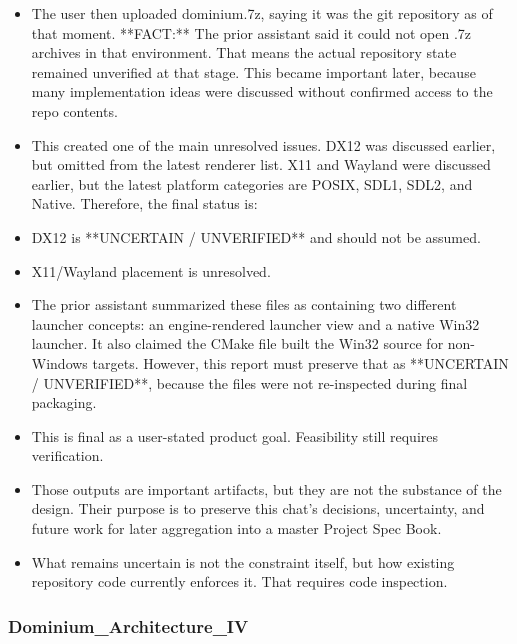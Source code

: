\documentclass[11pt,a4paper]{report}
\begin{document}
\begin{itemize}
\item The user then uploaded dominium.7z, saying it was the git repository as of that moment. **FACT:** The prior assistant said it could not open .7z archives in that environment. That means the actual repository state remained unverified at that stage. This became important later, because many implementation ideas were discussed without confirmed access to the repo contents.
\item This created one of the main unresolved issues. DX12 was discussed earlier, but omitted from the latest renderer list. X11 and Wayland were discussed earlier, but the latest platform categories are POSIX, SDL1, SDL2, and Native. Therefore, the final status is:
\item DX12 is **UNCERTAIN / UNVERIFIED** and should not be assumed.
\item X11/Wayland placement is unresolved.
\item The prior assistant summarized these files as containing two different launcher concepts: an engine-rendered launcher view and a native Win32 launcher. It also claimed the CMake file built the Win32 source for non-Windows targets. However, this report must preserve that as **UNCERTAIN / UNVERIFIED**, because the files were not re-inspected during final packaging.
\item This is final as a user-stated product goal. Feasibility still requires verification.
\item Those outputs are important artifacts, but they are not the substance of the design. Their purpose is to preserve this chat's decisions, uncertainty, and future work for later aggregation into a master Project Spec Book.
\item What remains uncertain is not the constraint itself, but how existing repository code currently enforces it. That requires code inspection.
\end{itemize}

\subsubsection{Dominium\_Architecture\_IV}
\end{document}
